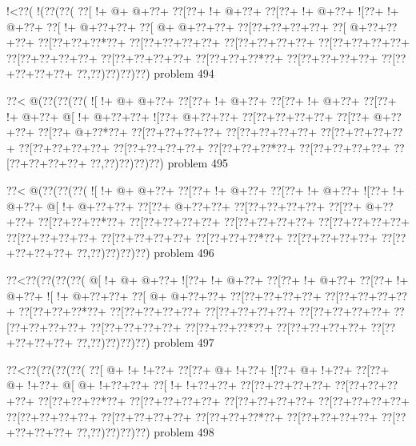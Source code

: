 \vbox{\vbox{\goo
\- !<\0??(\- !(\0??(\0??(
\0??[\- !+\- @+\- @+\0??+
\0??[\0??+\- !+\- @+\0??+
\0??[\0??+\- !+\- @+\0??+
\- ![\0??+\- !+\- @+\0??+
\0??[\- !+\- @+\0??+\0??+
\0??[\- @+\- @+\0??+\0??+
\0??[\0??+\0??+\0??+\0??+
\0??[\- @+\0??+\0??+\0??+
\0??[\0??+\0??+\0??*\0??+
\0??[\0??+\0??+\0??+\0??+
\0??[\0??+\0??+\0??+\0??+
\0??[\0??+\0??+\0??+\0??+
\0??[\0??+\0??+\0??+\0??+
\0??[\0??+\0??+\0??+\0??+
\0??[\0??+\0??+\0??*\0??+
\0??[\0??+\0??+\0??+\0??+
\0??[\0??+\0??+\0??+\0??+
\0??,\0??)\0??)\0??)\0??)
}
\hfil problem 494\hfil\break
}

\vbox{\vbox{\goo
\0??<\- @(\0??(\0??(\0??(
\- ![\- !+\- @+\- @+\0??+
\0??[\0??+\- !+\- @+\0??+
\0??[\0??+\- !+\- @+\0??+
\0??[\0??+\- !+\- @+\0??+
\- @[\- !+\- @+\0??+\0??+
\- ![\0??+\- @+\0??+\0??+
\0??[\0??+\0??+\0??+\0??+
\0??[\0??+\- @+\0??+\0??+
\0??[\0??+\- @+\0??*\0??+
\0??[\0??+\0??+\0??+\0??+
\0??[\0??+\0??+\0??+\0??+
\0??[\0??+\0??+\0??+\0??+
\0??[\0??+\0??+\0??+\0??+
\0??[\0??+\0??+\0??+\0??+
\0??[\0??+\0??+\0??*\0??+
\0??[\0??+\0??+\0??+\0??+
\0??[\0??+\0??+\0??+\0??+
\0??,\0??)\0??)\0??)\0??)
}
\hfil problem 495\hfil\break
}

\vbox{\vbox{\goo
\0??<\- @(\0??(\0??(\0??(
\- ![\- !+\- @+\- @+\0??+
\0??[\0??+\- !+\- @+\0??+
\0??[\0??+\- !+\- @+\0??+
\- ![\0??+\- !+\- @+\0??+
\- @[\- !+\- @+\0??+\0??+
\0??[\0??+\- @+\0??+\0??+
\0??[\0??+\0??+\0??+\0??+
\0??[\0??+\- @+\0??+\0??+
\0??[\0??+\0??+\0??*\0??+
\0??[\0??+\0??+\0??+\0??+
\0??[\0??+\0??+\0??+\0??+
\0??[\0??+\0??+\0??+\0??+
\0??[\0??+\0??+\0??+\0??+
\0??[\0??+\0??+\0??+\0??+
\0??[\0??+\0??+\0??*\0??+
\0??[\0??+\0??+\0??+\0??+
\0??[\0??+\0??+\0??+\0??+
\0??,\0??)\0??)\0??)\0??)
}
\hfil problem 496\hfil\break
}

\vbox{\vbox{\goo
\0??<\0??(\0??(\0??(\0??(
\- @[\- !+\- @+\- @+\0??+
\- ![\0??+\- !+\- @+\0??+
\0??[\0??+\- !+\- @+\0??+
\0??[\0??+\- !+\- @+\0??+
\- ![\- !+\- @+\0??+\0??+
\0??[\- @+\- @+\0??+\0??+
\0??[\0??+\0??+\0??+\0??+
\0??[\0??+\0??+\0??+\0??+
\0??[\0??+\0??+\0??*\0??+
\0??[\0??+\0??+\0??+\0??+
\0??[\0??+\0??+\0??+\0??+
\0??[\0??+\0??+\0??+\0??+
\0??[\0??+\0??+\0??+\0??+
\0??[\0??+\0??+\0??+\0??+
\0??[\0??+\0??+\0??*\0??+
\0??[\0??+\0??+\0??+\0??+
\0??[\0??+\0??+\0??+\0??+
\0??,\0??)\0??)\0??)\0??)
}
\hfil problem 497\hfil\break
}

\vbox{\vbox{\goo
\0??<\0??(\0??(\0??(\0??(
\0??[\- @+\- !+\- !+\0??+
\0??[\0??+\- @+\- !+\0??+
\- ![\0??+\- @+\- !+\0??+
\0??[\0??+\- @+\- !+\0??+
\- @[\- @+\- !+\0??+\0??+
\0??[\- !+\- !+\0??+\0??+
\0??[\0??+\0??+\0??+\0??+
\0??[\0??+\0??+\0??+\0??+
\0??[\0??+\0??+\0??*\0??+
\0??[\0??+\0??+\0??+\0??+
\0??[\0??+\0??+\0??+\0??+
\0??[\0??+\0??+\0??+\0??+
\0??[\0??+\0??+\0??+\0??+
\0??[\0??+\0??+\0??+\0??+
\0??[\0??+\0??+\0??*\0??+
\0??[\0??+\0??+\0??+\0??+
\0??[\0??+\0??+\0??+\0??+
\0??,\0??)\0??)\0??)\0??)
}
\hfil problem 498\hfil\break
}

